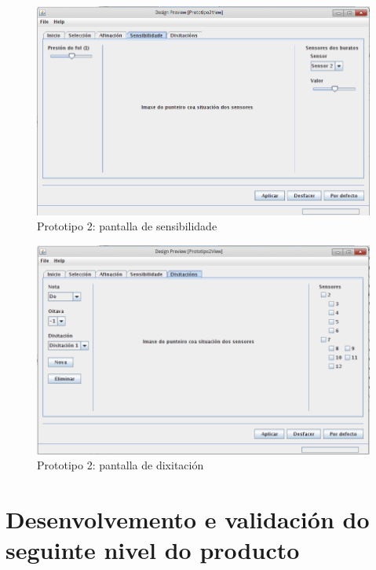  \begin{figure}[htbp]
  \centering
  \includegraphics[scale=0.6,keepaspectratio=true]{./imagenes/prototipo2_04.png}
  \caption{Prototipo 2: pantalla de sensibilidade}
  \label{figura:Prototipo2Sensibilidade}
 \end{figure}

 \begin{figure}[htbp]
  \centering
  \includegraphics[scale=0.6,keepaspectratio=true]{./imagenes/prototipo2_05.png}
  \caption{Prototipo 2: pantalla de dixitación}
  \label{figura:Prototipo2Dixitacion}
 \end{figure}

\section{Desenvolvemento e validación do seguinte nivel do producto}

